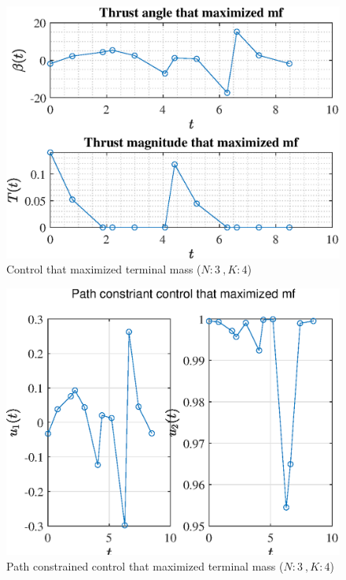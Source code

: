 \documentclass[]{article}
\begin{document}
	\begin{figure}
		\centering
		\includegraphics[scale=0.75]{control_N3_K4_C3_mf.eps}
		\caption{Control that maximized terminal mass (\(N:3\ , K:4\))}
		\label{fig:control_N3_K4_C3_mf}
	\end{figure}
	\begin{figure}
		\centering
		\includegraphics[scale=0.75]{path_N3_K4_C3_mf.eps}
		\caption{Path constrained control that maximized terminal mass (\(N:3\ , K:4\))}
		\label{fig:path_N3_K4_C3_mf}
	\end{figure}
\end{document}
